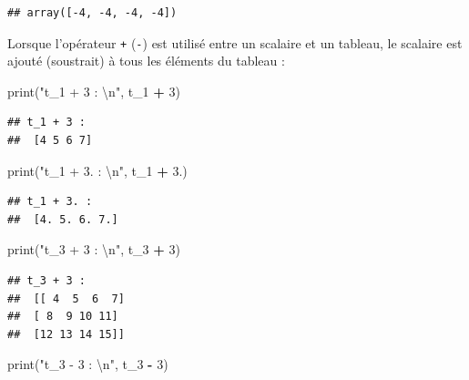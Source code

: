 \documentclass[
  12pt,
]{book}
\newenvironment{Shaded}{\begin{snugshade}}{\end{snugshade}}
\newcommand{\BuiltInTok}[1]{#1}
\newcommand{\CharTok}[1]{\textcolor[rgb]{0.31,0.60,0.02}{#1}}
\newcommand{\DecValTok}[1]{\textcolor[rgb]{0.00,0.00,0.81}{#1}}
\newcommand{\FloatTok}[1]{\textcolor[rgb]{0.00,0.00,0.81}{#1}}
\newcommand{\NormalTok}[1]{#1}
\newcommand{\OperatorTok}[1]{\textcolor[rgb]{0.81,0.36,0.00}{\textbf{#1}}}
\newcommand{\StringTok}[1]{\textcolor[rgb]{0.31,0.60,0.02}{#1}}
\numberwithin{equation}{section}
\numberwithin{countremarque}{section}
\begin{document}
\begin{lstlisting}
## array([-4, -4, -4, -4])
\end{lstlisting}

Lorsque l'opérateur \texttt{+} (\texttt{-}) est utilisé entre un scalaire et un tableau, le scalaire est ajouté (soustrait) à tous les éléments du tableau :

\begin{Shaded}
\begin{Highlighting}[]
\BuiltInTok{print}\NormalTok{(}\StringTok{"t\_1 + 3 : }\CharTok{\textbackslash{}n}\StringTok{"}\NormalTok{, t\_1 }\OperatorTok{+} \DecValTok{3}\NormalTok{)}
\end{Highlighting}
\end{Shaded}

\begin{lstlisting}
## t_1 + 3 : 
##  [4 5 6 7]
\end{lstlisting}

\begin{Shaded}
\begin{Highlighting}[]
\BuiltInTok{print}\NormalTok{(}\StringTok{"t\_1 + 3. : }\CharTok{\textbackslash{}n}\StringTok{"}\NormalTok{, t\_1 }\OperatorTok{+} \FloatTok{3.}\NormalTok{)}
\end{Highlighting}
\end{Shaded}

\begin{lstlisting}
## t_1 + 3. : 
##  [4. 5. 6. 7.]
\end{lstlisting}

\begin{Shaded}
\begin{Highlighting}[]
\BuiltInTok{print}\NormalTok{(}\StringTok{"t\_3 + 3 : }\CharTok{\textbackslash{}n}\StringTok{"}\NormalTok{, t\_3 }\OperatorTok{+} \DecValTok{3}\NormalTok{)}
\end{Highlighting}
\end{Shaded}

\begin{lstlisting}
## t_3 + 3 : 
##  [[ 4  5  6  7]
##  [ 8  9 10 11]
##  [12 13 14 15]]
\end{lstlisting}

\begin{Shaded}
\begin{Highlighting}[]
\BuiltInTok{print}\NormalTok{(}\StringTok{"t\_3 {-} 3 : }\CharTok{\textbackslash{}n}\StringTok{"}\NormalTok{, t\_3 }\OperatorTok{{-}} \DecValTok{3}\NormalTok{)}
\end{Highlighting}
\end{Shaded}
\end{document}
